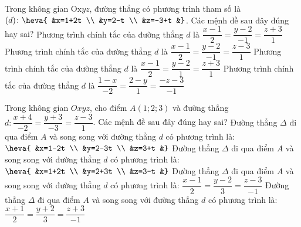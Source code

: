 \begin{ex}%
	Trong không gian $\mathrm{Ox} y z$, đường thẳng có phương trình tham số là $(d)\colon \heva{	&x=1+2t \\
		&y=2-t \\
		&z=-3+t
		&}$. Các mệnh đề sau đây đúng hay sai?
	\choiceTF
	{\True Phương trình chính tắc của đường thẳng $d$ là $\dfrac{x-1}{2}=\dfrac{y-2}{-1}=\dfrac{z+3}{1}$}
	{Phương trình chính tắc của đường thẳng $d$ là $\dfrac{x-1}{2}=\dfrac{y-2}{-1}=\dfrac{z-3}{1}$}
	{Phương trình chính tắc của đường thẳng $d$ là $\dfrac{x-1}{2}=\dfrac{y-2}{1}=\dfrac{z+3}{1}$}
	{\True Phương trình chính tắc của đường thẳng $d$ là $\dfrac{1-x}{-2}=\dfrac{2-y}{1}=\dfrac{-z-3}{-1}$}
\end{ex}
\begin{ex}%
	Trong không gian $Oxyz$, cho điểm $A(1; 2; 3)$ và đường thẳng $d: \dfrac{x+4}{-2}=\dfrac{y+3}{-3}=\dfrac{z-3}{1}$. Các mệnh đề sau đây đúng hay sai?
	\choiceTF
	{\True Đường thẳng $\Delta$ đi qua điểm $A$ và song song với đường thẳng $d$ có phương trình là: $\heva{	&x=1-2t \\
			&y=2-3t \\
			&z=3+t
			&}$}
	{\True Đường thẳng $\Delta$ đi qua điểm $A$ và song song với đường thẳng $d$ có phương trình là: $\heva{	&x=1+2t \\
			&y=2+3t \\
			&z=3-t
			&}$}
	{\True Đường thẳng $\Delta$ đi qua điểm $A$ và song song với đường thẳng $d$ có phương trình là: $\dfrac{x-1}{2}=\dfrac{y-2}{3}=\dfrac{z-3}{-1}$}
	{Đường thẳng $\Delta$ đi qua điểm $A$ và song song với đường thẳng $d$ có phương trình là: $\dfrac{x+1}{2}=\dfrac{y+2}{3}=\dfrac{z+3}{-1}$}
\end{ex}

